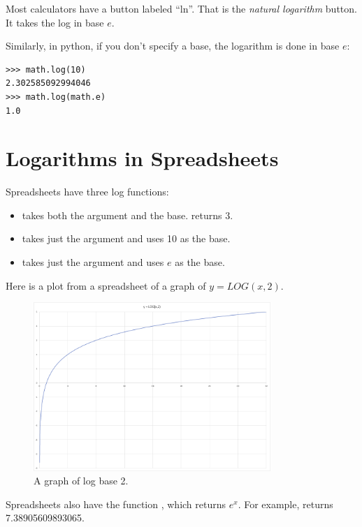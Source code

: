 Most calculators have a button labeled ``ln''. That is the
\textit{natural logarithm} button. It takes the log in base $e$.

Similarly, in python, if you don't specify a base, the logarithm is done in base $e$:

\begin{Verbatim}
>>> math.log(10)
2.302585092994046
>>> math.log(math.e)
1.0
\end{Verbatim}

\section{Logarithms in Spreadsheets}

Spreadsheets have three log functions:
\begin{itemize}
\item {} takes both the argument and the base.  returns 3.
\item {} takes just the argument and uses 10 as the base.
\item {} takes just the argument and uses $e$ as the base.
\end{itemize}

Here is a plot from a spreadsheet of a graph of $y = LOG(x, 2)$.
\begin{figure}[htbp]
    \centering
    \includegraphics[width=0.8\textwidth]{log_graph.png}
    \caption{A graph of log base 2.}
    \label{fig:log_graph}
\end{figure}

Spreadsheets also have the function , which returns
$e^x$.  For example,  returns 7.38905609893065.

